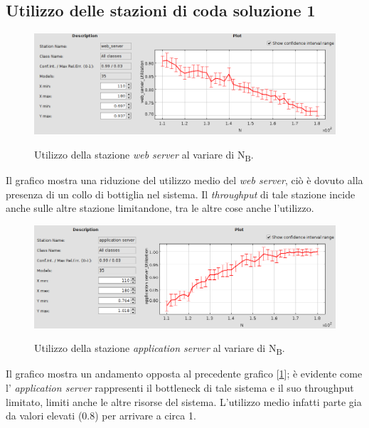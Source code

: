 \documentclass[../main.tex]{subfiles}
\begin{document}
    \subsection{Utilizzo delle stazioni di coda soluzione 1}\label{subsec:utilizzo-delle-stazioni-di-coda}
    \begin{figure}[H]
        \centering
        \includegraphics[scale = 0.45]{assets/utilization_ws.png}\\
        \caption[\textit{Utilizzo} della stazione \textit{web server}]{Utilizzo della stazione \textit{web server} al
        variare di N\textsubscript{B}.}
        \label{fig:utilizzo-ws}
    \end{figure}
    Il grafico mostra una riduzione del utilizzo medio del \textit{web server}, ciò è dovuto alla presenza di un collo
    di bottiglia nel sistema. Il \textit{throughput} di tale stazione incide anche sulle altre stazione limitandone, tra
    le altre cose anche l'utilizzo.

    \begin{figure}[H]
        \centering
        \includegraphics[scale = 0.45]{assets/utilization_as.png}\\
        \caption[\textit{Utilizzo} della stazione \textit{application server}]{Utilizzo della stazione\textit{
            application server} al variare di N\textsubscript{B}.}
        \label{fig:utilizzo-as}
    \end{figure}
    Il grafico mostra un andamento opposta al precedente grafico [\ref{fig:utilizzo-ws}]; è evidente come l'
    \textit{application server} rappresenti il bottleneck di tale sistema e il suo throughput limitato, limiti anche le
    altre risorse del sistema. L'utilizzo medio infatti parte gia da valori elevati (0.8) per arrivare a circa 1.
\end{document}
